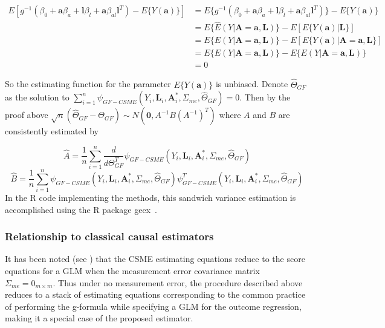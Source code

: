 \documentclass[12pt]{article}
\begin{document}
\begin{align*}
E[g^{-1}(\beta_{0} + \bm{a}\beta_{a} + \bm{l}\beta_{l} +
        \bm{a}\beta_{al}\bm{l}^{T}) - E \{ Y(\bm{a}) \}] &= E \{ g^{-1}(\beta_{0} + \bm{a}\beta_{a} + \bm{l}\beta_{l} +
        \bm{a}\beta_{al}\bm{l}^{T}) \} - E \{ Y(\bm{a}) \} \\
&= E \{ \hat{E}(Y | \bm{A} = \bm{a}, \bm{L}) \} - E[E \{ Y(\bm{a}) | \bm{L} \}] \\
&= E \{ E(Y | \bm{A} = \bm{a}, \bm{L}) \} - E[E \{ Y(\bm{a}) | \bm{A} = \bm{a}, \bm{L} \}] \\
&= E \{ E(Y | \bm{A} = \bm{a}, \bm{L}) \} - E\{ E(Y | \bm{A} = \bm{a}, \bm{L})\} \\
&=0
\end{align*}

So the estimating function for the parameter $E \{ Y(\bm{a}) \}$ is unbiased. Denote $\hat{\Theta}_{GF}$ as the solution to $\sum_{i=1}^{n} \psi_{GF-CSME}(Y_{i}, \bm{L}_{i}, \bm{A}^{*}_{i}, \Sigma_{me}, \hat{\Theta}_{GF}) = 0$. Then by the proof above $\sqrt{n}(\hat{\Theta}_{GF} - \Theta_{GF}) \sim N(\textbf{0}, A^{-1}B(A^{-1})^{T})$ where $A$ and $B$ are consistently estimated by

\begin{equation*}
\hat{A} = \frac{1}{n} \sum_{i=1}^{n} \frac{d}{d\Theta_{GF}^{T}} \psi_{GF-CSME}(Y_{i}, \bm{L}_{i}, \bm{A}^{*}_{i}, \Sigma_{me}, \hat{\Theta}_{GF})
\end{equation*}
\begin{equation*}
\hat{B} = \frac{1}{n} \sum_{i=1}^{n} \psi_{GF-CSME}(Y_{i}, \bm{L}_{i}, \bm{A}^{*}_{i}, \Sigma_{me}, \hat{\Theta}_{GF}) \psi^{T}_{GF-CSME}(Y_{i}, \bm{L}_{i}, \bm{A}^{*}_{i}, \Sigma_{me}, \hat{\Theta}_{GF})
\end{equation*}
In the R code implementing the methods, this sandwich variance estimation is accomplished using the R package geex~\citep{saul2017}.

\subsubsection{Relationship to classical causal estimators}

It has been noted (see \citet{carroll2006}) that the CSME estimating equations reduce to the score equations for a GLM when the measurement error covariance matrix $\Sigma_{me} = 0_{m \times m}$. Thus under no measurement error, the procedure described above reduces to a stack of estimating equations corresponding to the common practice of performing the g-formula while specifying a GLM for the outcome regression, making it a special case of the proposed estimator.
\end{document}
